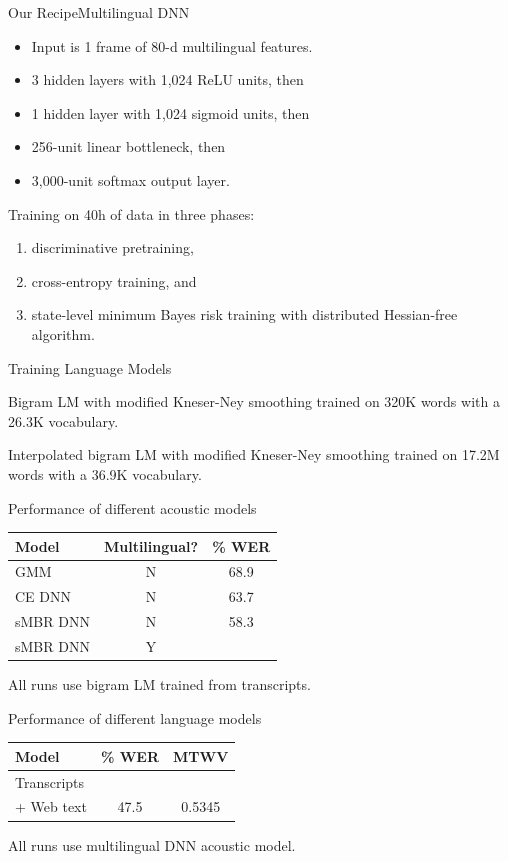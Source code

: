 \begin{frame}{Our Recipe}{Multilingual DNN}
  \begin{itemize}
  \item Input is 1 frame of 80-d multilingual features.
  \item 3 hidden layers with 1,024 ReLU units, then
  \item 1 hidden layer with 1,024 sigmoid units, then
  \item 256-unit linear bottleneck, then
  \item 3,000-unit softmax output layer.
  \end{itemize}
  \vfill
  Training on 40h of data in three phases:
  \begin{enumerate}
  \item discriminative pretraining,
  \item cross-entropy training, and
  \item state-level minimum Bayes risk training with distributed
    Hessian-free algorithm.
  \end{enumerate}
\end{frame}

\begin{frame}{Training Language Models}{}
  \begin{description}[On transcripts]
  \item[On transcripts] Bigram LM with modified Kneser-Ney smoothing
    trained on 320K words with a 26.3K vocabulary.
  \item[Plus web text] Interpolated bigram LM with modified Kneser-Ney
    smoothing trained on 17.2M words with a 36.9K vocabulary.
  \end{description}
\end{frame}

\begin{frame}{Performance of different acoustic models}{}
  \centering
  \begin{tabular}{@{}lcc@{}} \toprule
  {\bf Model} & {\bf Multilingual?} & {\bf \% WER} \\ \midrule
  GMM      & N & 68.9 \\
  CE DNN   & N & 63.7 \\
  sMBR DNN & N & 58.3 \\
  sMBR DNN & Y &      \\ \bottomrule
  \end{tabular}
  \vfill
  \raggedright
  All runs use bigram LM trained from transcripts.
\end{frame}

\begin{frame}{Performance of different language models}{}
  \centering
  \begin{tabular}{@{}lcc@{}} \toprule
  {\bf Model} & {\bf \% WER} & {\bf MTWV} \\ \midrule
  Transcripts & & \\
  + Web text  & 47.5 & 0.5345 \\ \bottomrule
  \end{tabular}
  \vfill
  \raggedright
  All runs use multilingual DNN acoustic model.
\end{frame}
